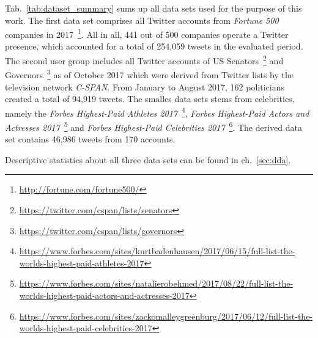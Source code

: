 Tab.~\ref{tab:dataset_summary} sums up all data sets used for the purpose of
this work.
The first data set comprises all Twitter accounts from \textit{Fortune 500}
companies in 2017~\footnote{\url{http://fortune.com/fortune500/}}.
All in all, 441 out of 500 companies operate a Twitter presence, which accounted
for a total of 254,059 tweets in the evaluated period.
The second user group includes all Twitter accounts of US Senators~\footnote{\url{https://twitter.com/cspan/lists/senators}} and Governors~\footnote{\url{https://twitter.com/cspan/lists/governors}}
as of October 2017 which were derived from Twitter lists by the television
network \textit{C-SPAN}.
From January to August 2017, 162 politicians created a total of 94,919 tweets.
The smalles data sets stems from celebrities, namely the \textit{Forbes Highest-Paid
Athletes 2017}~\footnote{\url{https://www.forbes.com/sites/kurtbadenhausen/2017/06/15/full-list-the-worlds-highest-paid-athletes-2017}}, \textit{Forbes Highest-Paid Actors and Actresses 2017}~\footnote{\url{https://www.forbes.com/sites/natalierobehmed/2017/08/22/full-list-the-worlds-highest-paid-actors-and-actresses-2017}} and
\textit{Forbes Highest-Paid Celebrities 2017}~\footnote{\url{https://www.forbes.com/sites/zackomalleygreenburg/2017/06/12/full-list-the-worlds-highest-paid-celebrities-2017}}.
The derived data set contains 46,986 tweets from 170 accounts.


Descriptive statistics about all three data sets can be found in ch.~\ref{sec:dda}.
